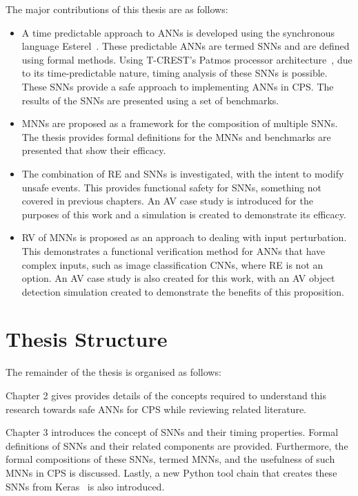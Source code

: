 The major contributions of this thesis are as follows:
\begin{itemize}
	\item A time predictable approach to \acp{ANN} is developed using the synchronous language Esterel~\cite{berry2000foundations}. These predictable \acp{ANN} are termed \acfp{SNN} and are defined using formal methods. Using T-CREST's Patmos processor architecture~\cite{patmos:ppes2011}, due to its time-predictable nature, timing analysis of these \acp{SNN} is possible. These \acp{SNN} provide a safe approach to implementing \acp{ANN} in \ac{CPS}. The results of the \acp{SNN} are presented using a set of benchmarks. 
	\item \acfp{MNN} are proposed as a framework for the composition of multiple \acp{SNN}. The thesis provides formal definitions for the \acp{MNN} and benchmarks are presented that show their efficacy. 
	\item The combination of \acf{RE} and \acp{SNN} is investigated, with the intent to modify unsafe events. This provides functional safety for \acp{SNN}, something not covered in previous chapters. An \acf{AV} case study is introduced for the purposes of this work and a simulation is created to demonstrate its efficacy.
	\item \acf{RV} of \acp{MNN} is proposed as an approach to dealing with input perturbation. This demonstrates a functional verification method for \acp{ANN} that have complex inputs, such as image classification \acfp{CNN}, where \ac{RE} is not an option. An \ac{AV} case study is also created for this work, with an \ac{AV} object detection simulation created to demonstrate the benefits of this proposition. 
\end{itemize}

\section{Thesis Structure}
The remainder of the thesis is organised as follows:

Chapter 2 gives provides details of the concepts required to understand this research towards safe \acp{ANN} for \ac{CPS} while reviewing related literature.

Chapter 3 introduces the concept of \acfp{SNN} and their timing properties.
Formal definitions of \acp{SNN} and their related components are provided.
Furthermore, the formal compositions of these \acp{SNN}, termed \acp{MNN}, and the usefulness of such \acp{MNN} in \ac{CPS} is discussed.
Lastly, a new Python tool chain that creates these \acp{SNN} from Keras~\cite{chollet2015keras} is also introduced.

